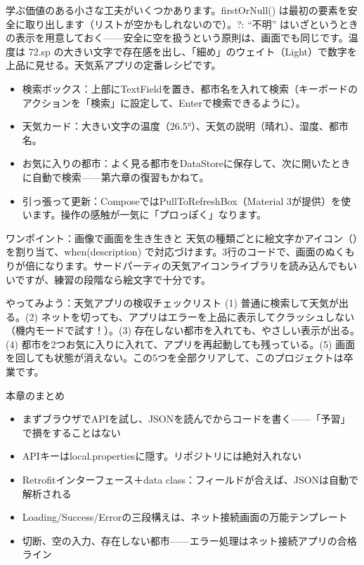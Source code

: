 学ぶ価値のある小さな工夫がいくつかあります。firstOrNull() は最初の要素を安全に取り出します（リストが空かもしれないので）。?: “不明” はいざというときの表示を用意しておく——安全に空を扱うという原則は、画面でも同じです。温度は 72.sp の大きい文字で存在感を出し、「細め」のウェイト（Light）で数字を上品に見せる。天気系アプリの定番レシピです。



\begin{itemize}
  \item 検索ボックス：上部にTextFieldを置き、都市名を入れて検索（キーボードのアクションを「検索」に設定して、Enterで検索できるように）。
  \item 天気カード：大きい文字の温度（26.5°）、天気の説明（晴れ）、湿度、都市名。
  \item お気に入りの都市：よく見る都市をDataStoreに保存して、次に開いたときに自動で検索——第六章の復習もかねて。
  \item 引っ張って更新：ComposeではPullToRefreshBox（Material 3が提供）を使います。操作の感触が一気に「プロっぽく」なります。
\end{itemize}

\begin{tcbinfo}{ワンポイント：画像で画面を生き生きと}
天気の種類ごとに絵文字かアイコン（）を割り当て、when(description) で対応づけます。3行のコードで、画面のぬくもりが倍になります。サードパーティの天気アイコンライブラリを読み込んでもいいですが、練習の段階なら絵文字で十分です。

\end{tcbinfo}

\begin{tcbpractice}{やってみよう：天気アプリの検収チェックリスト}
(1) 普通に検索して天気が出る。(2) ネットを切っても、アプリはエラーを上品に表示してクラッシュしない（機内モードで試す！）。(3) 存在しない都市を入れても、やさしい表示が出る。(4) 都市を2つお気に入りに入れて、アプリを再起動しても残っている。(5) 画面を回しても状態が消えない。この5つを全部クリアして、このプロジェクトは卒業です。

\end{tcbpractice}

\begin{tcbsummary}{本章のまとめ}
\begin{itemize}
  \item まずブラウザでAPIを試し、JSONを読んでからコードを書く——「予習」で損をすることはない
  \item APIキーはlocal.propertiesに隠す。リポジトリには絶対入れない
  \item Retrofitインターフェース＋data class：フィールドが合えば、JSONは自動で解析される
  \item Loading/Success/Errorの三段構えは、ネット接続画面の万能テンプレート
  \item 切断、空の入力、存在しない都市——エラー処理はネット接続アプリの合格ライン
\end{itemize}

\end{tcbsummary}
